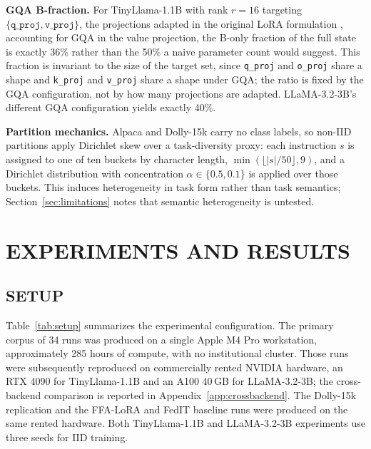 \textbf{GQA B-fraction.}
For TinyLlama-1.1B with rank $r{=}16$ targeting $\{\texttt{q\_proj}, \texttt{v\_proj}\}$, the projections adapted in the original LoRA formulation \cite{hu2022lora}, accounting for GQA in the value projection, the B-only fraction of the full state is exactly 36\% rather than the 50\% a naive parameter count would suggest. This fraction is invariant to the size of the target set, since \texttt{q\_proj} and \texttt{o\_proj} share a shape and \texttt{k\_proj} and \texttt{v\_proj} share a shape under GQA; the ratio is fixed by the GQA configuration, not by how many projections are adapted. LLaMA-3.2-3B's different GQA configuration yields exactly 40\%.

\textbf{Partition mechanics.}
Alpaca and Dolly-15k carry no class labels, so non-IID partitions apply Dirichlet skew over a task-diversity proxy: each instruction $s$ is assigned to one of ten buckets by character length, $\min(\lfloor |s| / 50 \rfloor, 9)$, and a Dirichlet distribution with concentration $\alpha \in \{0.5, 0.1\}$ is applied over those buckets. This induces heterogeneity in task form rather than task semantics; Section~\ref{sec:limitations} notes that semantic heterogeneity is untested.

\section{EXPERIMENTS AND RESULTS}
\label{sec:experiments}

\subsection{SETUP}
\label{sec:setup}
Table~\ref{tab:setup} summarizes the experimental configuration. The primary corpus of 34 runs was produced on a single Apple M4 Pro workstation, approximately 285 hours of compute, with no institutional cluster. Those runs were subsequently reproduced on commercially rented NVIDIA hardware, an RTX 4090 for TinyLlama-1.1B and an A100 40\,GB for LLaMA-3.2-3B; the cross-backend comparison is reported in Appendix~\ref{app:crossbackend}. The Dolly-15k replication and the FFA-LoRA and FedIT baseline runs were produced on the same rented hardware. Both TinyLlama-1.1B and LLaMA-3.2-3B experiments use three seeds for IID training.

